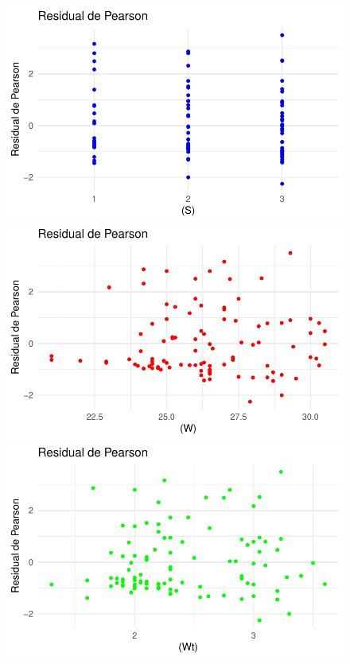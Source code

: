 \documentclass[
  letterpaper,
  DIV=11,
  numbers=noendperiod]{scrartcl}
\begin{document}
\begin{figure}

\begin{minipage}{0.50\linewidth}
\includegraphics{Modelos_files/figure-pdf/unnamed-chunk-28-1.pdf}\end{minipage}%
%
\begin{minipage}{0.50\linewidth}
\includegraphics{Modelos_files/figure-pdf/unnamed-chunk-28-2.pdf}\end{minipage}%
\newline
\begin{minipage}{0.50\linewidth}
\includegraphics{Modelos_files/figure-pdf/unnamed-chunk-28-3.pdf}\end{minipage}%

\end{figure}
\end{document}

